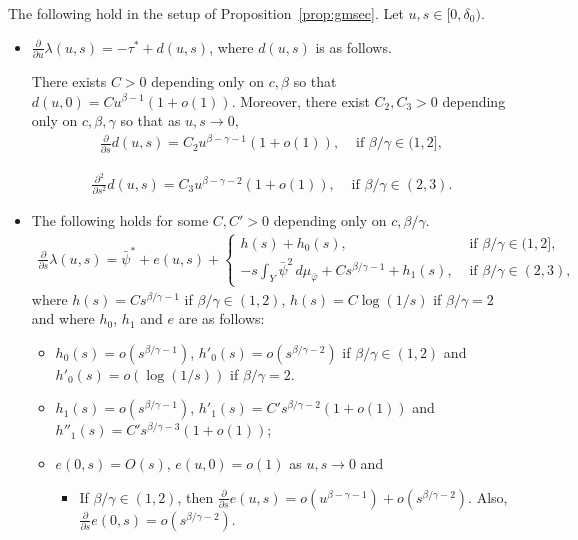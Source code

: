 \documentclass[10pt,a4paper]{amsart}
\def\phi{\varphi}
\begin{document}
\begin{lemma}\label{lemm:refev}
The following hold in the setup of Proposition~\ref{prop:gmsec}.  Let $u, s\in [0,\delta_0)$.
\begin{itemize}
 \item[(i)] $\frac{\partial}{\partial u}\lambda(u,s)=-\tau^*+d(u,s)$, where $d(u,s)$ is as follows.
 
 There exists $C>0$ depending only on $c,\beta$ so that $d(u,0)=
 Cu^{\beta-1}(1+o(1))$.  
 Moreover, there exist $C_2, C_3>0$ depending only on $c,\beta, \gamma$ so that
 as $u,s\to 0$,
 \begin{align*}
 \frac{\partial}{\partial s} d(u,s)=
 C_2 u^{\beta-\gamma-1}(1+o(1)), &\text{ if }\beta/\gamma\in (1,2],
   \end{align*}
 
  \begin{align*}
 \frac{\partial^2}{\partial s^2} d(u,s)=
 C_3 u^{\beta-\gamma-2}(1+o(1)), &\text{ if }\beta/\gamma\in (2,3).
  \end{align*}
  
 
 \item[(ii)] The following holds for some $C, C'>0$ depending only on $c,\beta/\gamma$.
  \begin{align*}
\frac{\partial}{\partial s}\lambda(u,s)=\bar\psi^*+ e(u,s) + \begin{cases}
h(s)+ h_0(s), &\text{ if }\beta/\gamma\in (1,2],\\
 -s\int_Y \bar\psi^2\, d\mu_{\overline{\phi}}+ Cs^{\beta/\gamma-1}+h_1(s), &\text{ if }\beta/\gamma\in (2,3),
 \end{cases}
  \end{align*} 
  where $h(s)=Cs^{\beta/\gamma-1}$ if  $\beta/\gamma\in (1,2)$, $h(s)=C\log(1/s)$ if  $\beta/\gamma=2$
  and where
    $h_0$, $h_1$  and $e$ are as follows: 
 \begin{itemize}
 \item[(a)] $h_0(s)=o(s^{\beta/\gamma-1})$, $h'_0(s)=o(s^{\beta/\gamma-2})$ if $\beta/\gamma\in (1,2)$
 and $h'_0(s)=o(\log(1/s))$ if $\beta/\gamma=2$.
 
 \item[(b)] $h_1(s)=o(s^{\beta/\gamma-1})$, $h'_1(s)=C' s^{\beta/\gamma-2}(1+o(1))$
  and $h''_1(s)=C' s^{\beta/\gamma-3}(1+o(1))$;
  
 \item[(c)] $e(0,s)=O(s)$, $e(u,0)=o(1)$ as $u,s\to 0$ and
  
 
  \begin{itemize}
  \item[(*)] If $\beta/\gamma\in (1,2)$, then $\frac{\partial}{\partial s} e(u,s)= o(u^{\beta-\gamma-1})+o(s^{\beta/\gamma-2})$.
  Also, $\frac{\partial}{\partial s} e(0,s)=o(s^{\beta/\gamma-2})$.
   

\end{itemize}
\end{itemize}
\end{itemize}
\end{lemma}
\end{document}
